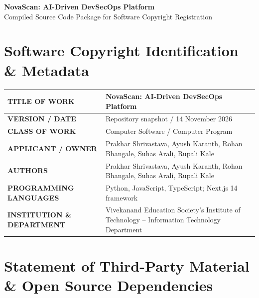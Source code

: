 \documentclass[11pt,a4paper]{article}
\begin{document}
\begin{center}
    {\LARGE\bfseries NovaScan: AI-Driven DevSecOps Platform}\\[6pt]
    {\large Compiled Source Code Package for Software Copyright Registration}\\[2pt]
\end{center}

\vspace{1.2em}

\section{Software Copyright Identification \& Metadata}

\begin{tabularx}{\textwidth}{@{}lX@{}}
\toprule
\textbf{TITLE OF WORK} & NovaScan: AI-Driven DevSecOps Platform \\
\midrule
\textbf{VERSION / DATE} & Repository snapshot / 14 November 2026 \\
\midrule
\textbf{CLASS OF WORK} & Computer Software / Computer Program\\
\midrule
\textbf{APPLICANT / OWNER} & Prakhar Shrivastava, Ayush Karanth, Rohan Bhangale, Suhas Arali, Rupali Kale
 \\
\midrule
\textbf{AUTHORS} & Prakhar Shrivastava, Ayush Karanth, Rohan Bhangale, Suhas Arali, Rupali Kale \\
\midrule
\textbf{PROGRAMMING LANGUAGES} & Python, JavaScript, TypeScript; Next.js 14 framework \\

\midrule
\textbf{INSTITUTION \& DEPARTMENT} & Vivekanand Education Society's Institute of Technology -- Information Technology Department \\
\bottomrule
\end{tabularx}

\vspace{1.5em}

\section{Statement of Third-Party Material \& Open Source Dependencies}
\end{document}
